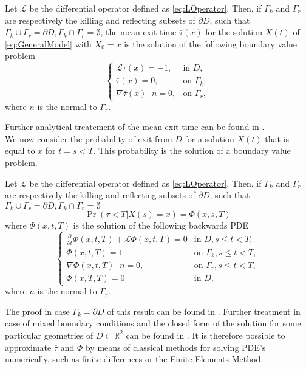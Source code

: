 \begin{theorem} Let $\mathcal L$ be the differential operator defined as \eqref{eq:LOperator}. Then, if $\Gamma_k$ and $\Gamma_r$ are respectively the killing and reflecting subsets of $\partial D$, such that $\Gamma_k \cup \Gamma_r = \partial D, \Gamma_k \cap \Gamma_r = \emptyset$, the mean exit time $\bar \tau(x)$ for the solution $X(t)$ of \eqref{eq:GeneralModel} with $X_0 = x$ is the solution of the following boundary value problem
\begin{equation}\label{eq:PDETau}
\begin{cases}
	\mathcal L \bar \tau(x) = -1, & \text{in } D, \\
	\bar\tau(x) = 0, & \text{on } \Gamma_k, \\
	\nabla \bar\tau(x) \cdot n = 0, & \text{on } \Gamma_r,
\end{cases}
\end{equation}
where $n$ is the normal to $\Gamma_r$.
\end{theorem}
Further analytical treatement of the mean exit time can be found in \cite{Krumscheid2015,Pavliotis2014}. \\
We now consider the probability of exit from $D$ for a solution $X(t)$ that is equal to $x$ for $t = s < T$. This probability is the solution of a boundary value problem.
\begin{theorem} Let $\mathcal L$ be the differential operator defined as \eqref{eq:LOperator}. Then, if $\Gamma_k$ and $\Gamma_r$ are respectively the killing and reflecting subsets of $\partial D$, such that $\Gamma_k \cup \Gamma_r = \partial D, \Gamma_k \cap \Gamma_r = \emptyset$
\begin{equation}\label{eq:ExitProbNotation}
	\Pr(\tau < T | X(s) = x) = \Phi(x,s,T) 
\end{equation}
where $\Phi(x,t,T)$ is the solution of the following backwards PDE
\begin{equation}\label{eq:PDEPhi}
\begin{cases}
	\frac{\partial}{\partial t} \Phi(x,t,T) + \mathcal L \Phi(x,t,T) = 0 & \text{in } D, s \leq t < T, \\
	\Phi(x,t,T) = 1 & \text{on } \Gamma_k, s \leq t < T,\\
	\nabla \Phi(x,t,T) \cdot n = 0, & \text{on } \Gamma_r, s \leq t < T, \\
	\Phi(x,T,T) = 0 & \text{in } D,
\end{cases}
\end{equation}
where $n$ is the normal to $\Gamma_r$.
\end{theorem}
The proof in case $\Gamma_k = \partial D$ of this result can be found in \cite{Sirovich2010}. Further treatment in case of mixed boundary conditions and the closed form of the solution for some particular geometries of $D \subset \mathbb{R}^2$ can be found in \cite{Grebenkov2014}. It is therefore possible to approximate $\bar\tau$ and $\Phi$ by means of classical methods for solving PDE's numerically, such as finite differences or the Finite Elements Method.


